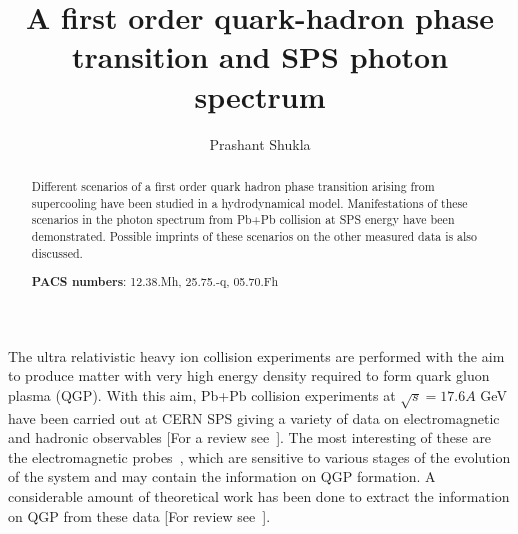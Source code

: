 



\title{A first order quark-hadron phase transition
            and SPS photon spectrum}
\author{Prashant Shukla}
\address{Nuclear Physics Division,\\
 Bhabha Atomic Research Center, Mumbai 400085, India}
\maketitle

\begin{abstract}
 Different scenarios of a first order quark hadron phase transition 
arising from supercooling have been studied in a hydrodynamical 
model. Manifestations of these scenarios in the photon spectrum 
from Pb+Pb collision at SPS energy have been demonstrated.
Possible imprints of these scenarios on the other measured data 
is also discussed.

\vspace{.1in}  
\noindent
{\bf PACS numbers}: 12.38.Mh, 25.75.-q, 05.70.Fh
\end{abstract}




\vspace{.2in}  

  The ultra relativistic heavy ion collision experiments are performed 
with the aim to produce matter with very high energy density required to 
form quark gluon plasma (QGP). With this aim, Pb+Pb collision experiments 
at $\sqrt s = 17.6A$ GeV have been carried out at CERN SPS giving a 
variety of data on electromagnetic and hadronic observables
[For a review see~\cite{ESKOLA}]. 
  The most interesting of these are the electromagnetic 
probes~\cite{WA98,CERES}, 
which are sensitive to various stages of the evolution of the system and 
may contain the information on QGP formation. 
  A considerable amount of theoretical work has been done
to extract the information on QGP from these 
data [For review see~\cite{PEITTHOMA,GALER}].

